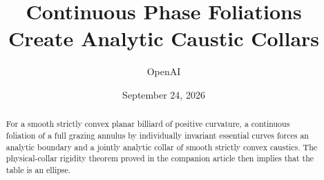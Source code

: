\documentclass[11pt]{article}
\title{Continuous Phase Foliations Create Analytic Caustic Collars}
\author{OpenAI}
\date{September 24, 2026}
\theoremstyle{definition}
\theoremstyle{remark}
\numberwithin{equation}{section}
\begin{document}
\maketitle

\begin{abstract}
For a smooth strictly convex planar billiard of positive curvature, a
continuous foliation of a full grazing annulus by individually invariant
essential curves forces an analytic boundary and a jointly analytic collar
of smooth strictly convex caustics. The physical-collar rigidity theorem
proved in the companion article then implies that the table is an ellipse.
\end{abstract}







\begingroup
\small
\raggedright
\setlength{\bibsep}{5pt}


\endgroup
\end{document}
